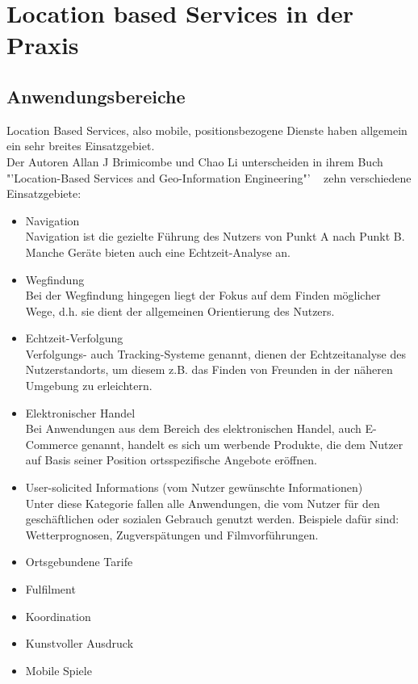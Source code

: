 \section{Location based Services in der Praxis}
	\subsection{Anwendungsbereiche}
Location Based Services, also mobile, positionsbezogene Dienste haben allgemein ein sehr breites Einsatzgebiet.\\
Der Autoren Allan J Brimicombe und Chao Li unterscheiden in ihrem Buch "'Location-Based Services and Geo-Information Engineering"' ~\cite[S.132]{brimicombe_li:application_area} zehn verschiedene Einsatzgebiete:
\begin{itemize}
	\item Navigation\\
Navigation ist die gezielte Führung des Nutzers von Punkt A nach Punkt B. Manche Geräte bieten auch eine Echtzeit-Analyse an.
	\item Wegfindung\\
Bei der Wegfindung hingegen liegt der Fokus auf dem Finden möglicher Wege, d.h. sie dient der allgemeinen Orientierung des Nutzers.
	\item Echtzeit-Verfolgung\\
Verfolgungs- auch Tracking-Systeme genannt, dienen der Echtzeitanalyse des Nutzerstandorts, um diesem z.B. das Finden von Freunden in der näheren Umgebung zu erleichtern.
	\item Elektronischer Handel\\
Bei Anwendungen aus dem Bereich des elektronischen Handel, auch E-Commerce genannt, handelt es sich um werbende Produkte, die dem Nutzer auf Basis seiner Position ortsspezifische Angebote eröffnen.
	\item User-solicited Informations (vom Nutzer gewünschte Informationen)\\
Unter diese Kategorie fallen alle Anwendungen, die vom Nutzer für den geschäftlichen oder sozialen Gebrauch genutzt werden. Beispiele dafür sind: Wetterprognosen, Zugverspätungen und Filmvorführungen.
	\item Ortsgebundene Tarife
	\item Fulfilment
	\item Koordination
	\item Kunstvoller Ausdruck
	\item Mobile Spiele
\end{itemize}

